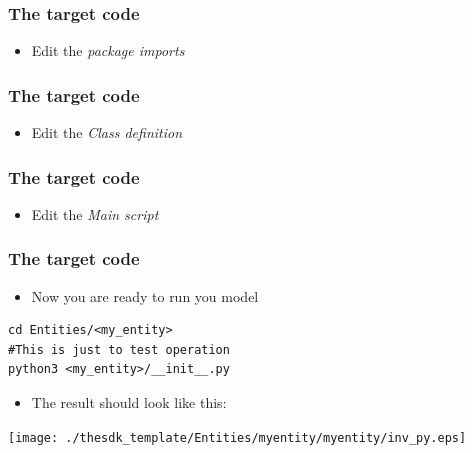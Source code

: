 \documentclass[logo=bluequo,normaltitle]{aaltoslides}
\begin{document}
\nextlines[8]
\begin{frame}[t,fragile]
    \frametitle{The target code} 
    \begin{itemize}
        \item Edit the \emph{package imports}
    \end{itemize}
\end{frame}

\nextlines[52]
\begin{frame}[t,fragile]
    \frametitle{The target code} 
    \begin{itemize}
        \item Edit the \emph{Class definition}
    \end{itemize}
\end{frame}

\nextlines[45]
\begin{frame}[t,fragile]
    \frametitle{The target code} 
    \begin{itemize}
        \item Edit the \emph{Main script}
    \end{itemize}
\end{frame}

\nextlines[45]
\begin{frame}[t,fragile]
    \frametitle{The target code} 
    \begin{itemize}
        \item Now you are ready to run you model
    \end{itemize}
\begin{lstlisting}
cd Entities/<my_entity>
#This is just to test operation 
python3 <my_entity>/__init__.py  
\end{lstlisting}
    \begin{itemize}
        \item The result should look like this:
    \end{itemize}
    \begin{center}
        \texttt{[image: ./thesdk\_template/Entities/myentity/myentity/inv\_py.eps]}
    \end{center}
\end{frame}
\end{document}
